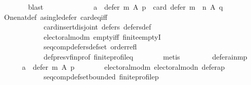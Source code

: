 \begin{isabellebody}
\ \ \ \ \ \ \isamarkupfalse%
\ blast\ \isanewline
\ \ \ \ \isamarkupfalse%
\ \isamarkupfalse%
\isanewline
\ \ \ \ \ \ {\isachardoublequoteopen}{\isacharparenleft}{\kern0pt}a\ {\isasymin}\ defer\ m\ A\ p{\isacharparenright}{\kern0pt}\ {\isasymlongrightarrow}\ card\ {\isacharparenleft}{\kern0pt}defer\ {\isacharparenleft}{\kern0pt}m\ {\isasymtriangleright}\ n{\isacharparenright}{\kern0pt}\ A\ q{\isacharparenright}{\kern0pt}\ {\isacharequal}{\kern0pt}\ {}{\isachardoublequoteclose}\isanewline
\ \ \ \ \ \ \isamarkupfalse%
\ One{\isacharunderscore}{\kern0pt}nat{\isacharunderscore}{\kern0pt}def\ a{\isacharunderscore}{\kern0pt}single{\isacharunderscore}{\kern0pt}defer\ card{\isacharunderscore}{\kern0pt}eq{\isacharunderscore}{\kern0pt}{}{\isacharunderscore}{\kern0pt}iff\isanewline
\ \ \ \ \ \ \ \ \ \ \ \ card{\isacharunderscore}{\kern0pt}insert{\isacharunderscore}{\kern0pt}disjoint\ defers{\isacharunderscore}{\kern0pt}{}\ defers{\isacharunderscore}{\kern0pt}def\isanewline
\ \ \ \ \ \ \ \ \ \ \ \ electoral{\isacharunderscore}{\kern0pt}mod{\isacharunderscore}{\kern0pt}m\ empty{\isacharunderscore}{\kern0pt}iff\ finite{\isachardot}{\kern0pt}emptyI\isanewline
\ \ \ \ \ \ \ \ \ \ \ \ seq{\isacharunderscore}{\kern0pt}comp{\isacharunderscore}{\kern0pt}defers{\isacharunderscore}{\kern0pt}def{\isacharunderscore}{\kern0pt}set\ order{\isacharunderscore}{\kern0pt}refl\isanewline
\ \ \ \ \ \ \ \ \ \ \ \ def{\isacharunderscore}{\kern0pt}presv{\isacharunderscore}{\kern0pt}fin{\isacharunderscore}{\kern0pt}prof\ finite{\isacharunderscore}{\kern0pt}profile{\isacharunderscore}{\kern0pt}q\isanewline
\ \ \ \ \ \ \isamarkupfalse%
\ metis\ \isanewline
\ \ \ \ \isamarkupfalse%
\ \isamarkupfalse%
\ defer{\isacharunderscore}{\kern0pt}a{\isacharunderscore}{\kern0pt}in{\isacharunderscore}{\kern0pt}m{\isacharunderscore}{\kern0pt}p{\isacharcolon}{\kern0pt}\isanewline
\ \ \ \ \ \ {\isachardoublequoteopen}a\ {\isasymin}\ defer\ m\ A\ p{\isachardoublequoteclose}\isanewline
\ \ \ \ \ \ \isamarkupfalse%
\ electoral{\isacharunderscore}{\kern0pt}mod{\isacharunderscore}{\kern0pt}m\ electoral{\isacharunderscore}{\kern0pt}mod{\isacharunderscore}{\kern0pt}n\ defer{\isacharunderscore}{\kern0pt}a{\isacharunderscore}{\kern0pt}p\isanewline
\ \ \ \ \ \ \ \ \ \ \ \ seq{\isacharunderscore}{\kern0pt}comp{\isacharunderscore}{\kern0pt}def{\isacharunderscore}{\kern0pt}set{\isacharunderscore}{\kern0pt}bounded\ finite{\isacharunderscore}{\kern0pt}profile{\isacharunderscore}{\kern0pt}p\isanewline

\end{isabellebody}
